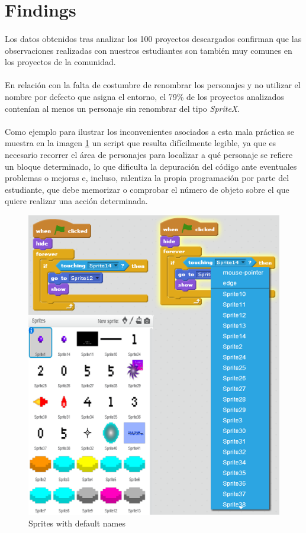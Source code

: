\documentclass[a4paper,10pt]{article}
\begin{document}
\section{Findings}
\paragraph{}Los datos obtenidos tras analizar los 100 proyectos descargados confirman que las observaciones realizadas con nuestros estudiantes son también muy comunes en los proyectos de la comunidad. 
\paragraph{}En relación con la falta de costumbre de renombrar los personajes y no utilizar el nombre por defecto que asigna el entorno, el 79\% de los proyectos analizados contenían al menos un personaje sin renombrar del tipo \textit{SpriteX}.
\paragraph{}Como ejemplo para ilustrar los inconvenientes asociados a esta mala práctica se muestra en la imagen \ref{fig:SpriteNaming} un script que resulta difícilmente legible, ya que es necesario recorrer el área de personajes para localizar a qué personaje se refiere un bloque determinado, lo que dificulta la depuración del código ante eventuales problemas o mejoras e, incluso, ralentiza la propia programación por parte del estudiante, que debe memorizar o comprobar el número de objeto sobre el que quiere realizar una acción determinada.
\begin{figure}
  \centering
    \includegraphics{img/SpriteNaming.png}
  \caption{Sprites with default names}
  \label{fig:SpriteNaming}
\end{figure}
\end{document}
